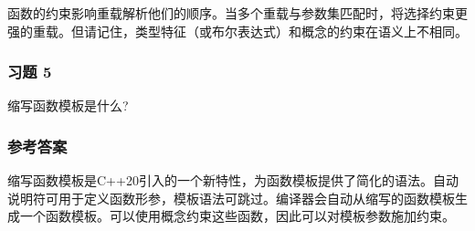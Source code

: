 函数的约束影响重载解析他们的顺序。当多个重载与参数集匹配时，将选择约束更强的重载。但请记住，类型特征（或布尔表达式）和概念的约束在语义上不相同。

\subsubsection{习题 5}

缩写函数模板是什么?

\subsubsection{参考答案}

缩写函数模板是C++20引入的一个新特性，为函数模板提供了简化的语法。自动说明符可用于定义函数形参，模板语法可跳过。编译器会自动从缩写的函数模板生成一个函数模板。可以使用概念约束这些函数，因此可以对模板参数施加约束。












